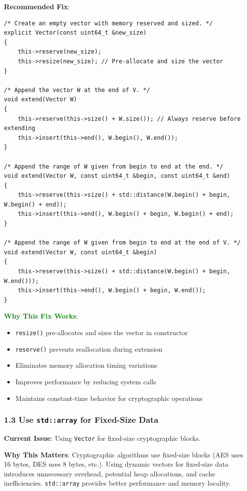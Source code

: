 \documentclass[11pt,a4paper]{article}
\begin{document}
\textbf{Recommended Fix}:
\begin{lstlisting}
/* Create an empty vector with memory reserved and sized. */
explicit Vector(const uint64_t &new_size)
{
    this->reserve(new_size);
    this->resize(new_size); // Pre-allocate and size the vector
}

/* Append the vector W at the end of V. */
void extend(Vector W)
{
    this->reserve(this->size() + W.size()); // Always reserve before extending
    this->insert(this->end(), W.begin(), W.end());
}

/* Append the range of W given from begin to end at the end. */
void extend(Vector W, const uint64_t &begin, const uint64_t &end)
{
    this->reserve(this->size() + std::distance(W.begin() + begin, W.begin() + end));
    this->insert(this->end(), W.begin() + begin, W.begin() + end);
}

/* Append the range of W given from begin to end at the end of V. */
void extend(Vector W, const uint64_t &begin)
{
    this->reserve(this->size() + std::distance(W.begin() + begin, W.end()));
    this->insert(this->end(), W.begin() + begin, W.end());
}
\end{lstlisting}

\textcolor{green}{\textbf{Why This Fix Works}}:
\begin{itemize}
    \item \texttt{resize()} pre-allocates and sizes the vector in constructor
    \item \texttt{reserve()} prevents reallocation during extension
    \item Eliminates memory allocation timing variations
    \item Improves performance by reducing system calls
    \item Maintains constant-time behavior for cryptographic operations
\end{itemize}

\subsubsection{1.3 Use \texttt{std::array} for Fixed-Size Data}

\textbf{Current Issue}: Using \texttt{Vector} for fixed-size cryptographic blocks.

\textbf{Why This Matters}: Cryptographic algorithms use fixed-size blocks (AES uses 16 bytes, DES uses 8 bytes, etc.). Using dynamic vectors for fixed-size data introduces unnecessary overhead, potential heap allocations, and cache inefficiencies. \texttt{std::array} provides better performance and memory locality.
\end{document}
